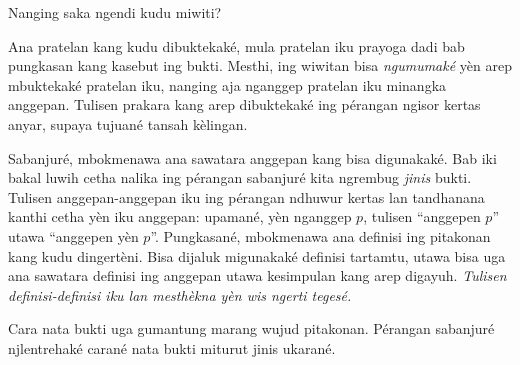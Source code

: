 \documentclass[../../../include/open-logic-section]{subfiles}
\begin{document}


Nanging saka ngendi kudu miwiti?

Ana pratelan kang kudu dibuktekaké, mula pratelan
iku prayoga dadi bab pungkasan kang kasebut ing bukti. Mesthi,
ing wiwitan bisa \emph{ngumumaké} yèn arep mbuktekaké
pratelan iku, nanging aja nganggep pratelan iku minangka anggepan.
Tulisen prakara kang arep dibuktekaké ing pérangan ngisor kertas
anyar, supaya tujuané tansah kèlingan.

Sabanjuré, mbokmenawa ana sawatara anggepan kang bisa digunakaké.
Bab iki bakal luwih cetha nalika ing pérangan sabanjuré kita ngrembug
\emph{jinis} bukti. Tulisen anggepan-anggepan iku ing pérangan
ndhuwur kertas lan tandhanana kanthi cetha yèn iku anggepan:
upamané, yèn nganggep $p$, tulisen ``anggepen $p$'' utawa
``anggepen yèn $p$''. Pungkasané, mbokmenawa ana definisi ing pitakonan
kang kudu dingertèni. Bisa dijaluk migunakaké
definisi tartamtu, utawa bisa uga ana sawatara definisi ing
anggepan utawa kesimpulan kang arep digayuh.
\emph{Tulisen definisi-definisi iku lan mesthèkna yèn wis
ngerti tegesé.}

Cara nata bukti uga gumantung marang wujud pitakonan. Pérangan
sabanjuré njlentrehaké carané nata bukti miturut jinis ukarané.
\end{document}
